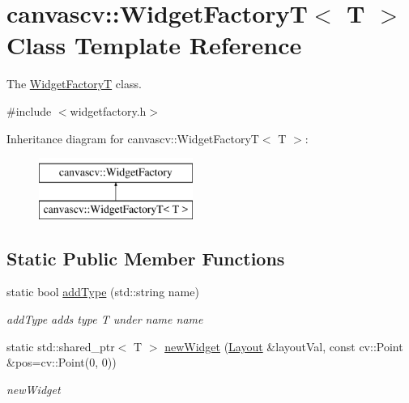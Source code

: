 \hypertarget{classcanvascv_1_1WidgetFactoryT}{}\section{canvascv\+:\+:Widget\+FactoryT$<$ T $>$ Class Template Reference}
\label{classcanvascv_1_1WidgetFactoryT}


The \hyperlink{classcanvascv_1_1WidgetFactoryT}{Widget\+FactoryT} class.  




{\ttfamily \#include $<$widgetfactory.\+h$>$}

Inheritance diagram for canvascv\+:\+:Widget\+FactoryT$<$ T $>$\+:\begin{figure}[H]
\begin{center}
\leavevmode
\includegraphics[height=2.000000cm]{classcanvascv_1_1WidgetFactoryT}
\end{center}
\end{figure}
\subsection*{Static Public Member Functions}
\begin{DoxyCompactItemize}
\item 
static bool \hyperlink{classcanvascv_1_1WidgetFactoryT_afc65f55a1043450975cc5431b10fbe89}{add\+Type} (std\+::string name)
\begin{DoxyCompactList}\small\item\em add\+Type adds type \textquotesingle{}T\textquotesingle{} under name \textquotesingle{}name\textquotesingle{} \end{DoxyCompactList}\item 
static std\+::shared\+\_\+ptr$<$ T $>$ \hyperlink{classcanvascv_1_1WidgetFactoryT_afa3a2961a2fdb649dacb86a07c3c26a0}{new\+Widget} (\hyperlink{classcanvascv_1_1Layout}{Layout} \&layout\+Val, const cv\+::\+Point \&pos=cv\+::\+Point(0, 0))
\begin{DoxyCompactList}\small\item\em new\+Widget \end{DoxyCompactList}\end{DoxyCompactItemize}


